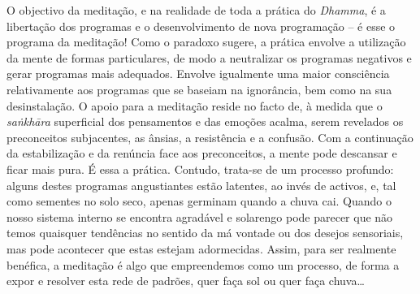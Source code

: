 O objectivo da meditação, e na realidade de toda a prática do \emph{Dhamma}, é a libertação dos programas e o desenvolvimento de nova programação -- é esse o programa da meditação! Como o paradoxo sugere, a prática envolve a utilização da mente de formas particulares, de modo a neutralizar os programas negativos e gerar programas mais adequados. Envolve igualmente uma maior consciência relativamente aos programas que se baseiam na ignorância, bem como na sua desinstalação. O apoio para a meditação reside no facto de, à medida que o \emph{saṅkhāra} superficial dos pensamentos e das emoções acalma, serem revelados os preconceitos subjacentes, as ânsias, a resistência e a confusão. Com a continuação da estabilização e da renúncia face aos preconceitos, a mente pode descansar e ficar mais pura. É essa a prática. Contudo, trata-se de um processo profundo: alguns destes programas angustiantes estão latentes, ao invés de activos, e, tal como sementes no solo seco, apenas germinam quando a chuva cai. Quando o nosso sistema interno se encontra agradável e solarengo pode parecer que não temos quaisquer tendências no sentido da má vontade ou dos desejos sensoriais, mas pode acontecer que estas estejam adormecidas. Assim, para ser realmente benéfica, a meditação é algo que empreendemos como um processo, de forma a expor e resolver esta rede de padrões, quer faça sol ou quer faça chuva\ldots{}

